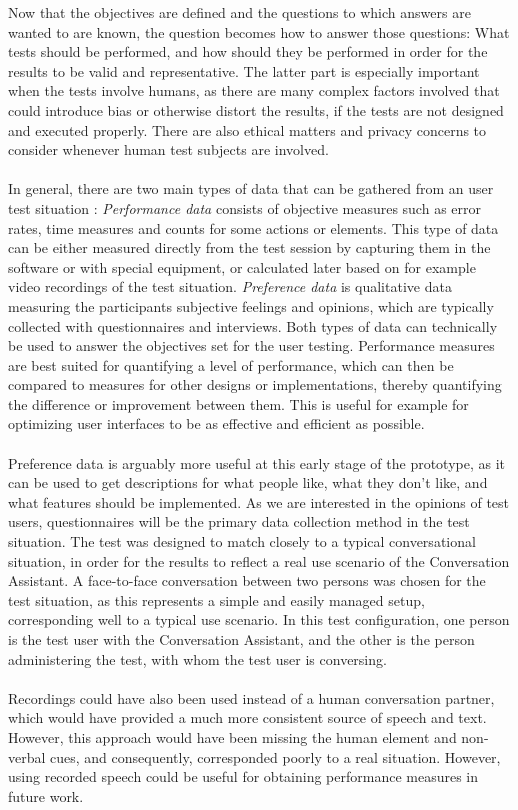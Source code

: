 \documentclass[english, 12pt, a4paper, pdftex, elec, utf8]{aaltothesis}
\begin{document}
Now that the objectives are defined and the questions to which answers are wanted to are known, the question becomes how to answer those questions: What tests should be performed, and how should they be performed in order for the results to be valid and representative. The latter part is especially important when the tests involve humans, as there are many complex factors involved that could introduce bias or otherwise distort the results, if the tests are not designed and executed properly. There are also ethical matters and privacy concerns to consider whenever human test subjects are involved. \cite{rubin2008handbook} \\\\
In general, there are two main types of data that can be gathered from an user test situation \cite[p.~165-166]{rubin2008handbook}: \textit{Performance data} consists of objective measures such as error rates, time measures and counts for some actions or elements. This type of data can be either measured directly from the test session by capturing them in the software or with special equipment, or calculated later based on for example video recordings of the test situation. \textit{Preference data} is qualitative data measuring the participants subjective feelings and opinions, which are typically collected with questionnaires and interviews. Both types of data can technically be used to answer the objectives set for the user testing. Performance measures are best suited for quantifying a level of performance, which can then be compared to measures for other designs or implementations, thereby quantifying the difference or improvement between them. This is useful for example for optimizing user interfaces to be as effective and efficient as possible. \\\\
Preference data is arguably more useful at this early stage of the prototype, as it can be used to get descriptions for what people like, what they don't like, and what features should be implemented. As we are interested in the opinions of test users, questionnaires will be the primary data collection method in the test situation. The test was designed to match closely to a typical conversational situation, in order for the results to reflect a real use scenario of the Conversation Assistant. A face-to-face conversation between two persons was chosen for the test situation, as this represents a simple and easily managed setup, corresponding well to a typical use scenario. In this test configuration, one person is the test user with the Conversation Assistant, and the other is the person administering the test, with whom the test user is conversing. \\\\
Recordings could have also been used instead of a human conversation partner, which would have provided a much more consistent source of speech and text. However, this approach would have been missing the human element and non-verbal cues, and consequently, corresponded poorly to a real situation. However, using recorded speech could be useful for obtaining performance measures in future work.
\clearpage
\end{document}

